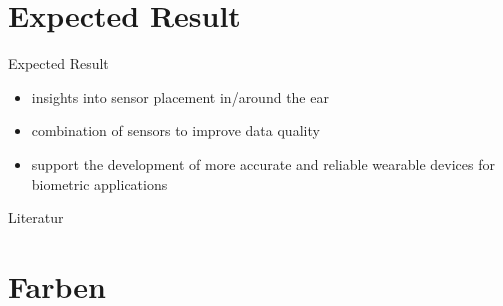 \documentclass[en]{sdqbeamer}
\begin{document}
\section{Expected Result}
\begin{frame}{Expected Result}
    \begin{itemize}
        \item insights into sensor placement in/around the ear
        \item combination of sensors to improve data quality
        \item support the development of more accurate and reliable wearable devices for biometric applications
    \end{itemize}
\end{frame}

\appendix
\beginbackup



\begin{frame}{Literatur}
    \printbibliography
\end{frame}

\section{Farben}
\backupend
\end{document}
